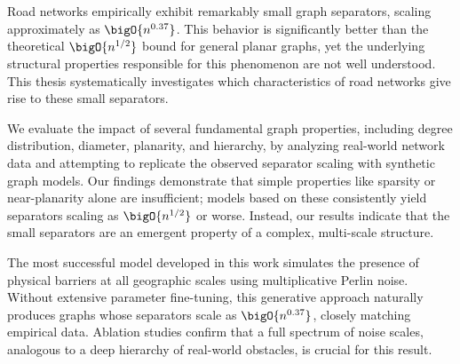 
\section*{\abstractname}

Road networks empirically exhibit remarkably small graph separators, scaling approximately as \(\bigO{n^{0.37}}\).
This behavior is significantly better than the theoretical \(\bigO{n^{1/2}}\) bound for general planar graphs, yet the underlying structural properties responsible for this phenomenon are not well understood.
This thesis systematically investigates which characteristics of road networks give rise to these small separators.

We evaluate the impact of several fundamental graph properties, including degree distribution, diameter, planarity, and hierarchy, by analyzing real-world network data and attempting to replicate the observed separator scaling with synthetic graph models.
Our findings demonstrate that simple properties like sparsity or near-planarity alone are insufficient; models based on these consistently yield separators scaling as \(\bigO{n^{1/2}}\) or worse.
Instead, our results indicate that the small separators are an emergent property of a complex, multi-scale structure.

The most successful model developed in this work simulates the presence of physical barriers at all geographic scales using multiplicative Perlin noise.
Without extensive parameter fine-tuning, this generative approach naturally produces graphs whose separators scale as \(\bigO{n^{0.37}}\), closely matching empirical data.
Ablation studies confirm that a full spectrum of noise scales, analogous to a deep hierarchy of real-world obstacles, is crucial for this result.
